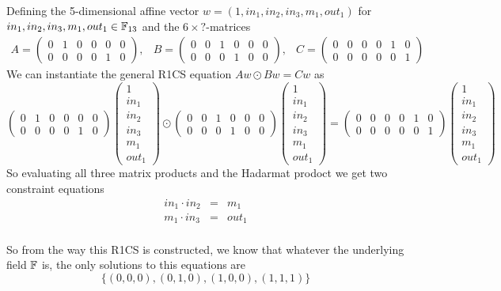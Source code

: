 \begin{example}
\label{main_example_2_4}
Defining the 5-dimensional affine vector $w =(1,in_1,in_2,in_3,m_1,out_1)$ for $in_1,in_2,in_3,m_1,out_1 \in \mathbb{F}_{13}$ and the $6\times ?$-matrices
$$
\begin{array}{lcr}
A = \begin{pmatrix}
0 & 1 & 0 & 0 & 0 & 0 \\ 
0 & 0 & 0 & 0 & 1 & 0
\end{pmatrix}, &
B = \begin{pmatrix}
0 & 0 & 1 & 0 & 0 & 0 \\ 
0 & 0 & 0 & 1 & 0 & 0
\end{pmatrix}, &
C = \begin{pmatrix}
0 & 0 & 0 & 0 & 1 & 0 \\ 
0 & 0 & 0 & 0 & 0 & 1
\end{pmatrix} 
\end{array}
$$
We can instantiate the general R1CS equation $Aw \odot Bw = Cw$ as
$$
\begin{pmatrix}
0 & 1 & 0 & 0 & 0 & 0 \\ 
0 & 0 & 0 & 0 & 1 & 0
\end{pmatrix} 
\begin{pmatrix}
1\\ in_1 \\ in_2 \\ in_3 \\ m_1 \\ out_1 
\end{pmatrix}\odot 
\begin{pmatrix}
0 & 0 & 1 & 0 & 0 & 0 \\ 
0 & 0 & 0 & 1 & 0 & 0
\end{pmatrix} 
\begin{pmatrix}
1\\ in_1 \\ in_2 \\ in_3 \\ m_1 \\ out_1 
\end{pmatrix} =
\begin{pmatrix}
0 & 0 & 0 & 0 & 1 & 0 \\ 
0 & 0 & 0 & 0 & 0 & 1
\end{pmatrix} 
\begin{pmatrix}
1\\ in_1 \\ in_2 \\ in_3 \\ m_1 \\ out_1 
\end{pmatrix}
$$
So evaluating all three matrix products and the Hadarmat prodoct we get two constraint equations
$$
\begin{array}{rcl}
in_1 \cdot in_2  &= & m_1 \\
m_1 \cdot in_3  &= & out_1 \\
\end{array}
$$
\end{example}
So from the way this R1CS is constructed, we know that whatever the underlying field $\mathbb{F}$ is, the only solutions to this equations are
$$
\{(0,0,0), (0,1,0), (1,0,0), (1,1,1)\}
$$

